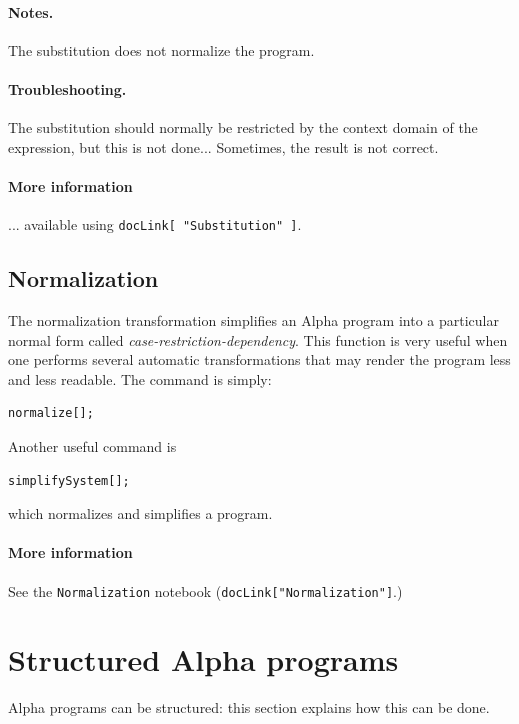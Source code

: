 \documentclass[12pt]{article}
\newcommand{\Alpha}{{\sc Alpha}}
\newcommand{\alfa}{\Alpha}
\begin{document}
\paragraph*{Notes.} The substitution does not normalize the 
program. 

\paragraph*{Troubleshooting.} The substitution should normally
be restricted by the context domain of the expression, but this
is not done... Sometimes, the result is not correct. 

\paragraph*{More information}
... available using \texttt{docLink[ "Substitution" ]}.

\subsection{Normalization}
\label{normalization}
The normalization transformation simplifies an {\Alpha} program into a
{particular} normal form called {\em case-restriction-dependency}.
This function is very useful when one performs several automatic
transformations that may render the program less and less
readable. The command is simply: 
\begin{verbatim}
normalize[];
\end{verbatim}
Another useful command is 
\begin{verbatim}
simplifySystem[];
\end{verbatim}
which normalizes and simplifies a program.

\paragraph*{More information}
See the \texttt{Normalization} notebook
(\texttt{docLink["Normalization"]}.)

\section{Structured  {\Alpha} programs}
\label{structured}
\label{sectstruct}
\alfa{} programs can be structured: this section explains 
how this can be done. 
\end{document}
